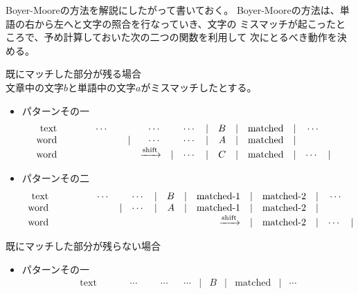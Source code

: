 {	Boyer-Mooreの方法を解説\cite{lecroq}にしたがって書いておく。
	Boyer-Mooreの方法は、単語の右から左へと文字の照合を行なっていき、文字の
	ミスマッチが起こったところで、予め計算しておいた次の二つの関数を利用して
	次にとるべき動作を決める。
	\begin{description}\setlength{\itemsep}{-1mm} %
		\item[good suffix shift] 既にマッチした部分が残る場合 \\
		文章中の文字$b$と単語中の文字$a$がミスマッチしたとする。
		\begin{itemize}\setlength{\itemsep}{-1mm} %
			\item パターンその一
			\begin{equation*}\begin{array}{rcrcrcrcrcrcrcrcrcr}
			\text{text} &\quad& &\cdots& && \cdots && \cdots &|& B &|& \text{matched} &|& \cdots \\
			\text{word} &\quad& && &|& \cdots && \cdots &|& A &|& \text{matched} &|& \\
			\text{word} &\quad& && && \xrightarrow[{}]{\text{shift}} &|& \cdots &|& C &|& \text{matched} &|& \cdots &|& \\
			\end{array}\end{equation*}
			\item パターンその二
			\begin{equation*}\begin{array}{rcrcrcrcrcrcrcrcr}
			\text{text} &\quad& && \cdots && \cdots &|& B &|& \text{matched-1} &|& \text{matched-2} &|& \cdots \\
			\text{word} &\quad& && &|& \cdots &|& A &|& \text{matched-1} &|& \text{matched-2} &|& \\
			\text{word} &\quad& && && && && \xrightarrow[{}]{\text{shift}} &|& \text{matched-2}  &|& \cdots &|& \\
			\end{array}\end{equation*}
		\end{itemize} %
		\item[bad character shift] 既にマッチした部分が残らない場合 \\
		\begin{itemize}\setlength{\itemsep}{-1mm} %
			\item パターンその一
			\begin{equation*}\begin{array}{rcrcrcrcrcrcrcrcrcr}
			\text{text} &\quad& &\cdots& && \cdots && \cdots &|& B &|& \text{matched} &|& \cdots \\

\end{array}
\end{equation*}
\end{itemize}
\end{description}}
